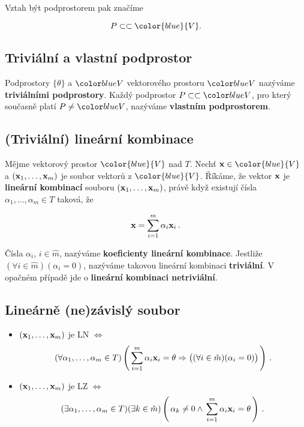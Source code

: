 Vztah být podprostorem pak značíme

\[ P\subset \subset \color{blue}{V}. \]

\subsection*{Triviální a vlastní podprostor}

Podprostory $\{\theta\}$ a $\clr{blue}{V}$ vektorového prostoru $\clr{blue}{V}$
nazýváme \textbf{triviálními podprostory}. Každý podprostor $P\ssubset
      \clr{blue}{V}$, pro který současně platí $P\neq \clr{blue}{V}$, nazýváme
\textbf{vlastním podprostorem}.

\subsection*{(Triviální) lineární kombinace}

Mějme vektorový prostor $\color{blue}{V}$ nad $T$. Nechť $\vx\in
      \color{blue}{V}$ a $(\mathbf{x}_{1},\dots,\mathbf{x}_{m})$ je soubor vektorů z
$\color{blue}{V}$. Říkáme, že vektor $\mathbf{x}$ je \textbf{lineární kombinací}
souboru $(\mathbf{x}_{1},\dots,\mathbf{x}_{m})$, právě když existují čísla
$\alpha_{1},\dots,\alpha_{m}\in T$ taková, že

\[ \mathbf{x}=\sum_{i=1}^{m}\alpha_{i}\mathbf{x}_{i}\,. \]

Čísla $\alpha_{i}$, $i\in\hat{m}$, nazýváme \textbf{koeficienty lineární kombinace}.
Jestliže $(\forall i\in\hat{m})(\alpha_{i}=0)$, nazýváme takovou lineární kombinaci \textbf{triviální}.
V opačném případě jde o \textbf{lineární kombinaci netriviální}.

\subsection*{Lineárně (ne)závislý soubor}

\begin{itemize}
      \item $(\mathbf{x}_{1},\dots,\mathbf{x}_{m})$ je LN $\Leftrightarrow$
            \[ (\forall \alpha_{1},\dots,\alpha_{m}\in T)\left(\,\sum_{i=1}^{m}\alpha_{i}\mathbf{x}_{i}=\theta \Rightarrow \big((\forall i\in\hat{m})(\alpha_{i}=0)\big)\,\right)\,. \]
      \item $(\mathbf{x}_{1},\dots,\mathbf{x}_{m})$ je LZ $\Leftrightarrow$
            \[ (\exists \alpha_{1},\dots,\alpha_{m}\in T) (\exists k\in\hat{m})
                  \left(\,\alpha_{k}\neq0 \wedge \,\sum_{i=1}^{m}\alpha_{i}\mathbf{x}_{i}=\theta\,\right)\,.
            \]
\end{itemize}

